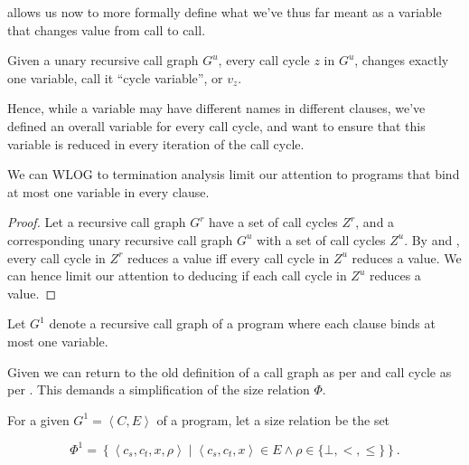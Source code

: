  allows us now to more formally define
what we've thus far meant as a variable that changes value from call to call.

\begin{definition}\label{definition:variable} Given a unary recursive call
graph $G^u$, every call cycle $z$ in $G^u$, changes exactly one variable, call
it ``cycle variable'', or $v_z$.\end{definition}

Hence, while a variable may have different names in different clauses, we've
defined an overall variable for every call cycle, and want to ensure that this
variable is reduced in every iteration of the call cycle.

\begin{theorem}\label{theorem:multivariable-patterns} We can WLOG to
termination analysis limit our attention to programs that bind at most one
variable in every clause.\end{theorem}

\begin{proof} Let a recursive call graph $G^r$ have a set of call cycles $Z^r$,
and a corresponding unary recursive call graph $G^u$ with a set of call cycles
$Z^u$. By  and
, every call cycle in $Z^r$ reduces a value
iff every call cycle in $Z^u$ reduces a value. We can hence limit our attention
to deducing if each call cycle in $Z^u$ reduces a value.\end{proof}

\begin{definition}\label{definition:nice-call-graph} Let $G^1$ denote a
recursive call graph of a program where each clause binds at most one
variable.\end{definition}

Given  we can return to the old
definition of a call graph as per  and
call cycle as per . This demands a
simplification of the size relation $\Phi$.

\begin{definition}\label{definition:unary-size-relation} For a given $G^1 =
\left\langle C,E \right\rangle$ of a program, let a size relation be the set

$$\Phi^1 = \left\{ \left\langle c_s, c_t,x, \rho \right\rangle \mid
\left\langle c_s, c_t,x \right\rangle \in E \wedge \rho\in\{\bot, <, \leq\}
\right\}.$$

\end{definition}

